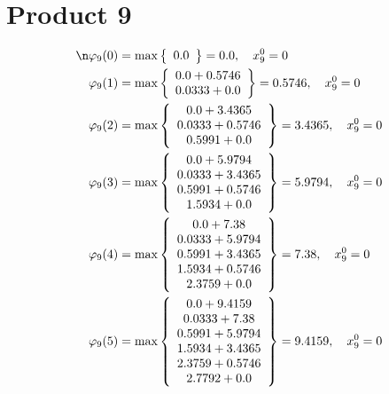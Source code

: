 \documentclass{article}
\begin{document}
\section{Product 9}
\begin{align*}
\n  
  
\varphi_{9}(0) &= \max \left\{ \begin{array}{c}
0.0
\end{array} \right\}=0.0,\quad x_{9}^0=0\\
  
  
  
  
\varphi_{9}(1) &= \max \left\{ \begin{array}{c}
0.0 + 0.5746 \\
 0.0333 + 0.0
\end{array} \right\}=0.5746,\quad x_{9}^0=0\\
  
  
  
  
\varphi_{9}(2) &= \max \left\{ \begin{array}{c}
0.0 + 3.4365 \\
 0.0333 + 0.5746 \\
 0.5991 + 0.0
\end{array} \right\}=3.4365,\quad x_{9}^0=0\\
  
  
  
  
\varphi_{9}(3) &= \max \left\{ \begin{array}{c}
0.0 + 5.9794 \\
 0.0333 + 3.4365 \\
 0.5991 + 0.5746 \\
 1.5934 + 0.0
\end{array} \right\}=5.9794,\quad x_{9}^0=0\\
  
  
  
  
\varphi_{9}(4) &= \max \left\{ \begin{array}{c}
0.0 + 7.38 \\
 0.0333 + 5.9794 \\
 0.5991 + 3.4365 \\
 1.5934 + 0.5746 \\
 2.3759 + 0.0
\end{array} \right\}=7.38,\quad x_{9}^0=0\\
  
  
  
  
\varphi_{9}(5) &= \max \left\{ \begin{array}{c}
0.0 + 9.4159 \\
 0.0333 + 7.38 \\
 0.5991 + 5.9794 \\
 1.5934 + 3.4365 \\
 2.3759 + 0.5746 \\
 2.7792 + 0.0
\end{array} \right\}=9.4159,\quad x_{9}^0=0\\
  

\end{align*}
\end{document}
